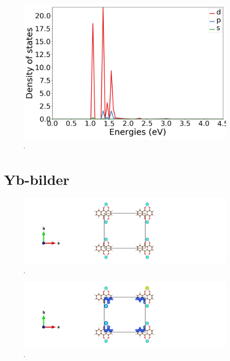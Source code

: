 \documentclass{article}
\begin{document}
  \begin{figure}[H]
      \centering
      \includegraphics[width = 11cm]{../fig/Y_k4_LDOS26_2.png}
      \caption{. }
      \label{fig:Y_k4_LDOS26_2.png}
  \end{figure}

\vspace{1cm}

\section{Yb-bilder}

  \begin{figure}[H]
      \centering
      \includegraphics[width = 11cm]{../fig/Yb_staticbefore_CONTCAR.png}
      \caption{. }
      \label{fig:Yb_staticbefore_CONTCAR}
  \end{figure}

  \begin{figure}[H]
      \centering
      \includegraphics[width = 11cm]{../fig/Yb_staticbefore_CHGCAR.png}
      \caption{. }
      \label{fig:Yb_staticbefore_CHGCAR}
  \end{figure}
\end{document}
